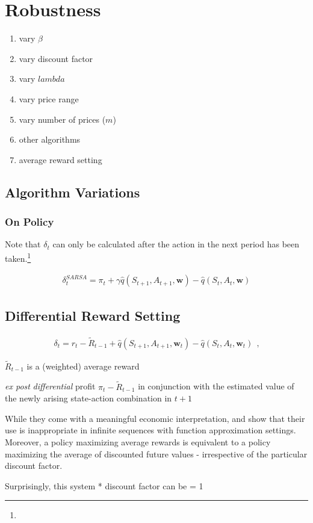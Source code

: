 \section{Robustness}

\begin{enumerate}
	\item vary $\beta$
	\item vary discount factor
	\item vary $lambda$
	\item vary price range
	\item vary number of prices ($m$)
	\item other algorithms
	\item average reward setting
\end{enumerate}

\subsection{Algorithm Variations}\label{vary_algorithm}

\subsubsection{On Policy}

Note that $\delta_t$ can only be calculated after the action in the next period has been taken.\footnote{}

\begin{gather}
	\delta_t^{SARSA} = \pi_t + \gamma \hat{q}(S_{t+1}, A_{t+1}, \boldsymbol{w}) - \hat{q}(S_t, A_t, \boldsymbol{w})
\end{gather}
		

\subsection{Differential Reward Setting}

\begin{gather}
\delta_t = r_t - \widetilde{R}_{t-1} + \hat{q}(S_{t+1}, A_{t+1}, \boldsymbol{w}_t) - \hat{q}(S_t, A_t, \boldsymbol{w}_t) ~~   \text{,}
\end{gather}

$\widetilde{R}_{t-1}$ is a (weighted) average reward

\emph{ex post} \emph{differential} profit $\pi_t - \widetilde{R}_{t-1}$ in conjunction with the estimated value of the newly arising state-action combination in $t+1$

While they come with a meaningful economic interpretation, \textcite{sutton_reinforcement_2018} and \textcite{naik_discounted_2019} show that their use is inappropriate in infinite sequences with function approximation settings. Moreover, a policy maximizing average rewards is equivalent to a policy maximizing the average of discounted future values - irrespective of the particular discount factor.

Surprisingly, this system 
* discount factor can be = 1




\pagebreak